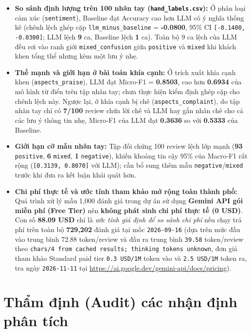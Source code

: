\begin{itemize}
  \item \textbf{So sánh định lượng trên 100 nhãn tay (\texttt{hand\_labels.csv}):} Ở phân loại cảm xúc (\texttt{sentiment}), Baseline đạt Accuracy cao hơn LLM có ý nghĩa thống kê (chênh lệch ghép cặp \texttt{llm\_minus\_baseline} = \textbf{-0.0800}, 95\% CI \texttt{[-0.1400, -0.0300]}; LLM lệch \textbf{9} ca, Baseline lệch \textbf{1} ca). Toàn bộ 9 ca lệch của LLM đều rơi vào ranh giới \texttt{mixed\_confusion} giữa \texttt{positive} và \texttt{mixed} khi khách khen tổng thể nhưng kèm một lưu ý nhẹ.
  \item \textbf{Thế mạnh và giới hạn ở bài toán khía cạnh:} Ở trích xuất khía cạnh khen (\texttt{aspects\_praise}), LLM đạt Micro-F1 = \textbf{0.8503}, cao hơn \textbf{0.6934} của mô hình từ điển trên tập nhãn tay; chưa thực hiện kiểm định ghép cặp cho chênh lệch này. Ngược lại, ở khía cạnh bị chê (\texttt{aspects\_complaint}), do tập nhãn tay chỉ có \textbf{7/100} review chứa lời chê và LLM hay gắn nhãn chê cho cả các lưu ý thông tin nhẹ, Micro-F1 của LLM đạt \textbf{0.3636} so với \textbf{0.5333} của Baseline.
  \item \textbf{Giới hạn cỡ mẫu nhãn tay:} Tập đối chứng 100 review lệch lớp mạnh (\textbf{93} \texttt{positive}, \textbf{6} \texttt{mixed}, \textbf{1} \texttt{negative}), khiến khoảng tin cậy 95\% của Macro-F1 rất rộng (\texttt{[0.3139, 0.8070]} với LLM); cần bổ sung thêm mẫu \texttt{negative}/\texttt{mixed} trước khi đưa ra kết luận khái quát hơn.
  \item \textbf{Chi phí thực tế và ước tính tham khảo mở rộng toàn thành phố:} Quá trình xử lý mẫu 1,000 đánh giá trong dự án sử dụng \textbf{Gemini API gói miễn phí (Free Tier)} nên \textbf{không phát sinh chi phí thực tế (0 USD)}. Con số \textbf{88.09 USD} chỉ là \textit{ước tính giả định để so sánh chi phí} nếu chạy trả phí trên toàn bộ \textbf{729,202} đánh giá tại mốc \texttt{2026-09-16} (dựa trên mức đầu vào trung bình 72.88 token/review và đầu ra trung bình \texttt{39.58} token/review theo \texttt{chars/4 from cached results; thinking tokens unknown}, đơn giá tham khảo Standard paid tier \texttt{0.3 USD/1M} token vào và \texttt{2.5 USD/1M} token ra, tra ngày \texttt{2026-11-11} tại \url{https://ai.google.dev/gemini-api/docs/pricing}).
\end{itemize}

\FloatBarrier
\section{Thẩm định (Audit) các nhận định phân tích}


